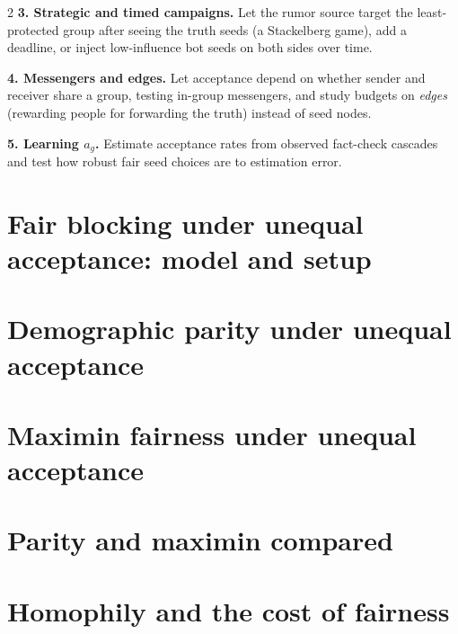 \documentclass[11pt]{article}
\begin{document}
\begin{multicols}{2}
\textbf{3. Strategic and timed campaigns.} Let the rumor source target the least-protected group after seeing the truth seeds (a Stackelberg game), add a deadline, or inject low-influence bot seeds on both sides over time.

\textbf{4. Messengers and edges.} Let acceptance depend on whether sender and receiver share a group, testing in-group messengers, and study budgets on \emph{edges} (rewarding people for forwarding the truth) instead of seed nodes.

\textbf{5. Learning $a_g$.} Estimate acceptance rates from observed fact-check cascades and test how robust fair seed choices are to estimation error.

\end{multicols}

\twocolumn
\setlength{\emergencystretch}{1.5em}  %

\section{Fair blocking under unequal acceptance: model and setup}\label{sec:setup}


\section{Demographic parity under unequal acceptance}



\section{Maximin fairness under unequal acceptance}


\section{Parity and maximin compared}\label{sec:compare}


\section{Homophily and the cost of fairness}\label{sec:homophily}

\end{document}
